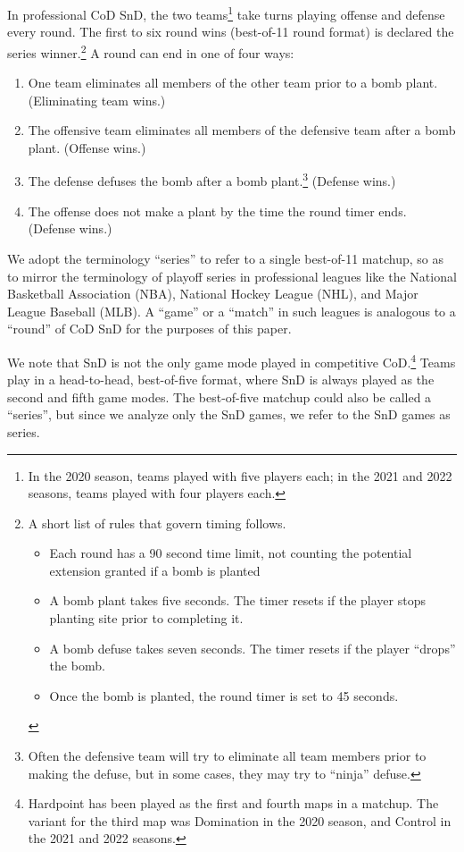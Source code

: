 \documentclass{article}
\providecommand{\tightlist}{%
  \setlength{\itemsep}{0pt}\setlength{\parskip}{0pt}}
\begin{document}
In professional CoD SnD, the two teams\footnote{In the 2020 season,
  teams played with five players each; in the 2021 and 2022 seasons,
  teams played with four players each.} take turns playing offense and
defense every round. The first to six round wins (best-of-11 round
format) is declared the series winner.\footnote{A short list of rules
  that govern timing follows.

  \begin{itemize}
  \tightlist
  \item
    Each round has a 90 second time limit, not counting the potential
    extension granted if a bomb is planted
  \item
    A bomb plant takes five seconds. The timer resets if the player
    stops planting site prior to completing it.
  \item
    A bomb defuse takes seven seconds. The timer resets if the player
    ``drops'' the bomb.
  \item
    Once the bomb is planted, the round timer is set to 45 seconds.
  \end{itemize}} A round can end in one of four ways:

\begin{enumerate}
\def\labelenumi{\arabic{enumi}.}
\tightlist
\item
  One team eliminates all members of the other team prior to a bomb
  plant. (Eliminating team wins.)
\item
  The offensive team eliminates all members of the defensive team after
  a bomb plant. (Offense wins.)
\item
  The defense defuses the bomb after a bomb plant.\footnote{Often the
    defensive team will try to eliminate all team members prior to
    making the defuse, but in some cases, they may try to ``ninja''
    defuse.} (Defense wins.)
\item
  The offense does not make a plant by the time the round timer ends.
  (Defense wins.)
\end{enumerate}

We adopt the terminology ``series'' to refer to a single best-of-11
matchup, so as to mirror the terminology of playoff series in
professional leagues like the National Basketball Association (NBA),
National Hockey League (NHL), and Major League Baseball (MLB). A
``game'' or a ``match'' in such leagues is analogous to a ``round'' of
CoD SnD for the purposes of this paper.

We note that SnD is not the only game mode played in competitive
CoD.\footnote{Hardpoint has been played as the first and fourth maps in
  a matchup. The variant for the third map was Domination in the 2020
  season, and Control in the 2021 and 2022 seasons.} Teams play in a
head-to-head, best-of-five format, where SnD is always played as the
second and fifth game modes. The best-of-five matchup could also be
called a ``series'', but since we analyze only the SnD games, we refer
to the SnD games as series.
\end{document}
